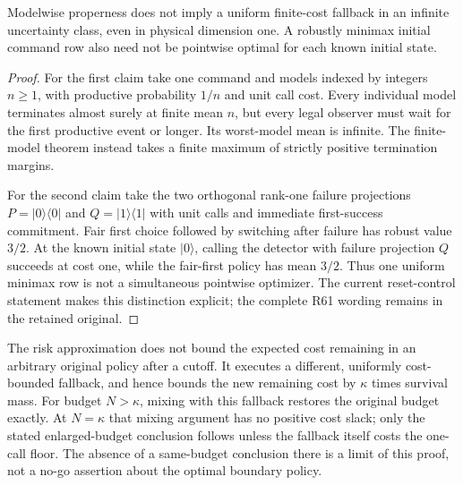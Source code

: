 \begin{proposition}\label{prop:supp-uniform}
Modelwise properness does not imply a uniform finite-cost fallback in an infinite uncertainty class, even in physical dimension one. A robustly minimax initial command row also need not be pointwise optimal for each known initial state.
\end{proposition}
\begin{proof}
For the first claim take one command and models indexed by integers $n\ge1$, with productive probability $1/n$ and unit call cost. Every individual model terminates almost surely at finite mean $n$, but every legal observer must wait for the first productive event or longer. Its worst-model mean is infinite. The finite-model theorem instead takes a finite maximum of strictly positive termination margins.

For the second claim take the two orthogonal rank-one failure projections $P=|0\rangle\langle0|$ and $Q=|1\rangle\langle1|$ with unit calls and immediate first-success commitment. Fair first choice followed by switching after failure has robust value $3/2$. At the known initial state $|0\rangle$, calling the detector with failure projection $Q$ succeeds at cost one, while the fair-first policy has mean $3/2$. Thus one uniform minimax row is not a simultaneous pointwise optimizer. The current reset-control statement makes this distinction explicit; the complete R61 wording remains in the retained original.
\end{proof}

The risk approximation does not bound the expected cost remaining in an arbitrary original policy after a cutoff. It executes a different, uniformly cost-bounded fallback, and hence bounds the new remaining cost by $\kappa$ times survival mass. For budget $N>\kappa$, mixing with this fallback restores the original budget exactly. At $N=\kappa$ that mixing argument has no positive cost slack; only the stated enlarged-budget conclusion follows unless the fallback itself costs the one-call floor. The absence of a same-budget conclusion there is a limit of this proof, not a no-go assertion about the optimal boundary policy.


